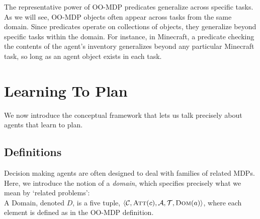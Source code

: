\documentclass[11pt]{article}
\begin{document}
The representative power of OO-MDP predicates generalize across specific tasks. As we will see, OO-MDP objects
often appear across tasks from the same domain. Since predicates operate on collections
of objects, they generalize beyond specific tasks within the domain.
For instance, in Minecraft, a predicate checking the contents of the agent's inventory
generalizes beyond any particular Minecraft task, so long as an agent object exists in each task.


%
\section{Learning To Plan}
\label{sec:learning_to_plan}

We now introduce the conceptual framework that lets us talk precisely about agents that learn to plan.

\subsection{Definitions}

Decision making agents are often designed to deal with families of related MDPs. Here, we introduce the notion of a {\it domain}, which specifies precisely what we mean by `related problems': \\

{ A \textup{Domain}, denoted $D$, is a five tuple, $\langle \mathcal{C}, \textsc{Att}(c), \mathcal{A}, \mathcal{T}, \textsc{Dom}(a) \rangle$, where each element is defined as in the OO-MDP definition.} 

\end{document}
